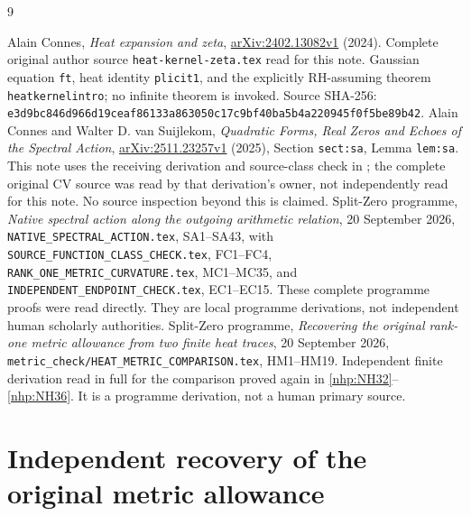 \documentclass[11pt]{article}
\begin{document}
\begin{thebibliography}{9}\raggedright
{}
Alain Connes, \emph{Heat expansion and zeta},
\href{https://arxiv.org/abs/2402.13082v1}{arXiv:2402.13082v1}
(2024). Complete original author source
\texttt{heat-kernel-zeta.tex} read for this note.
Gaussian equation \texttt{ft}, heat identity \texttt{plicit1},
and the explicitly RH-assuming theorem
\texttt{heatkernelintro}; no infinite theorem is invoked.
Source SHA-256:
\texttt{e3d9bc846d966d19ceaf86133a863050c17c9bf40ba5b4a220945f0f5be89b42}.
Alain Connes and Walter D. van Suijlekom,
\emph{Quadratic Forms, Real Zeros and Echoes of the Spectral Action},
\href{https://arxiv.org/abs/2511.23257v1}{arXiv:2511.23257v1}
(2025), Section \texttt{sect:sa}, Lemma \texttt{lem:sa}.
This note uses the receiving derivation and source-class
check in \cite{nhp:NativeAction}; the complete original CV
source was read by that derivation's owner, not independently
read for this note. No source inspection beyond this is claimed.
Split-Zero programme, \emph{Native spectral action along the
outgoing arithmetic relation}, 20 September 2026,
\texttt{NATIVE\_SPECTRAL\_ACTION.tex}, SA1--SA43, with
\texttt{SOURCE\_FUNCTION\_CLASS\_CHECK.tex}, FC1--FC4,
\texttt{RANK\_ONE\_METRIC\_CURVATURE.tex}, MC1--MC35, and
\texttt{INDEPENDENT\_ENDPOINT\_CHECK.tex}, EC1--EC15.
These complete programme proofs were read directly.
They are local programme derivations, not independent
human scholarly authorities.
Split-Zero programme, \emph{Recovering the original rank-one
metric allowance from two finite heat traces},
20 September 2026,
\texttt{metric\_check/HEAT\_METRIC\_COMPARISON.tex},
HM1--HM19. Independent finite derivation read in full
for the comparison proved again in \eqref{nhp:NH32}--\eqref{nhp:NH36}.
It is a programme derivation, not a human primary source.
\end{thebibliography}

\endgroup

\clearpage\begingroup
\part*{Independent recovery of the original metric allowance}
\newtheorem{nhmtheorem}{Theorem}
\newtheorem{nhmlemma}{Lemma}
\newcommand{\nhmtr}{\operatorname{tr}}
\newcommand{\nhmadj}{\dagger_G}
\newcommand{\nhmRea}{\operatorname{Re}}
\newcommand{\nhmIma}{\operatorname{Im}}
\end{document}
